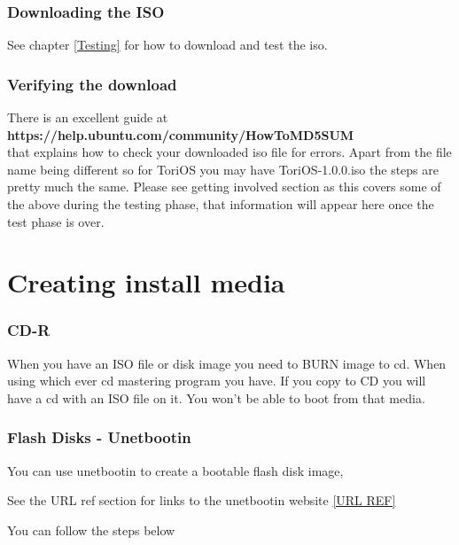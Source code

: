 \documentclass[12pt,a4paper]{book}
\begin{document}
\subsection{Downloading the ISO}

See chapter \ref{Testing} for how to download and test the iso. 



\subsection{Verifying the download}
There is an excellent guide at\\ \textbf{https://help.ubuntu.com/community/HowToMD5SUM} \\
that explains how to check your downloaded iso file for errors.  Apart from the file name being different so for ToriOS you may have ToriOS-1.0.0.iso the steps are pretty much the same.  
Please see getting involved section as this covers some of the above during the testing phase,  that information will appear here once the test phase is over. 
\chapter{Creating install media}

\subsection{CD-R}

When you have an ISO file or disk image you need to BURN image to cd.  When using which ever cd mastering program you have.  If you copy to CD you will have a cd with an ISO file on it.  You won't be able to boot from that media.

\subsection{Flash Disks - Unetbootin}
You can use unetbootin to create a bootable flash disk image,   

See the URL ref section for links to the unetbootin website \ref{URL REF}

You can follow the steps below \\
\end{document}
